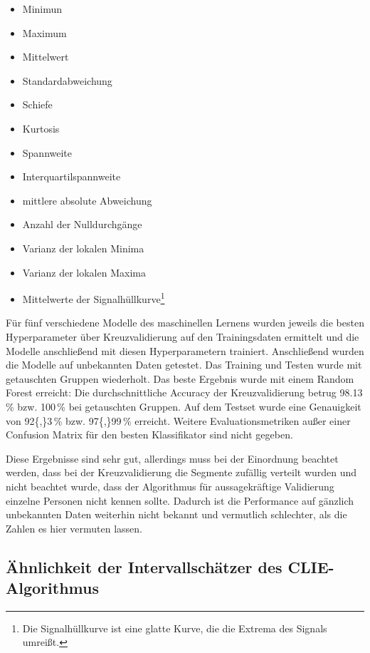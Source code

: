 	\begin{itemize}
		\item Minimun
		\item Maximum
		\item Mittelwert
		\item Standardabweichung
		\item Schiefe
		\item Kurtosis
		\item Spannweite
		\item Interquartilspannweite
		\item mittlere absolute Abweichung
		\item Anzahl der Nulldurchgänge
		\item Varianz der lokalen Minima
		\item Varianz der lokalen Maxima
		\item Mittelwerte der Signalhüllkurve\footnote{Die Signalhüllkurve ist eine glatte Kurve, die die Extrema des Signals umreißt.}
	\end{itemize}
	
	Für fünf verschiedene Modelle des maschinellen Lernens wurden jeweils die besten Hyperparameter über Kreuzvalidierung auf den Trainingsdaten ermittelt und die Modelle anschließend mit diesen Hyperparametern trainiert. Anschließend wurden die Modelle auf unbekannten Daten getestet. Das Training und Testen wurde mit getauschten Gruppen wiederholt. Das beste Ergebnis wurde mit einem Random Forest erreicht: Die durchschnittliche Accuracy der Kreuzvalidierung betrug \num{98,13}\,\% bzw. \num{100}\,\% bei getauschten Gruppen. Auf dem Testset wurde eine Genauigkeit von \num{92{,}3}\,\% bzw. \num{97{,}99}\,\% erreicht. Weitere Evaluationsmetriken außer einer Confusion Matrix für den besten Klassifikator sind nicht gegeben.
	
	Diese Ergebnisse sind sehr gut, allerdings muss bei der Einordnung beachtet werden, dass bei der Kreuzvalidierung die Segmente zufällig verteilt wurden und nicht beachtet wurde, dass der Algorithmus für aussagekräftige Validierung einzelne Personen nicht kennen sollte. Dadurch ist die Performance auf gänzlich unbekannten Daten weiterhin nicht bekannt und vermutlich schlechter, als die Zahlen es hier vermuten lassen.
	
	\subsection{Ähnlichkeit der Intervallschätzer des CLIE-Algorithmus}\label{brueserQI}
	
